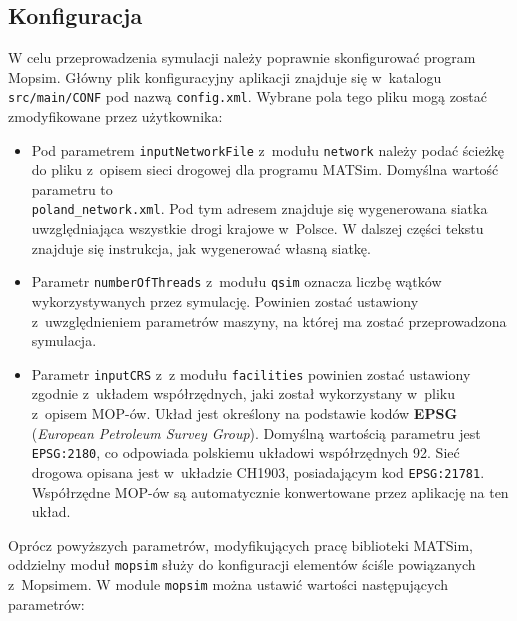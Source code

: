 \subsection{Konfiguracja}
W celu przeprowadzenia symulacji należy poprawnie skonfigurować program Mopsim. Główny plik konfiguracyjny aplikacji znajduje się w~katalogu \texttt{src/main/CONF} pod nazwą \texttt{config.xml}. Wybrane pola tego pliku mogą zostać zmodyfikowane przez użytkownika:
\begin{itemize}
\item Pod parametrem \texttt{inputNetworkFile} z~modułu \texttt{network} należy podać ścieżkę do pliku z~opisem sieci drogowej dla programu MATSim. Domyślna wartość parametru to \\\texttt{poland\_network.xml}. Pod tym adresem znajduje się wygenerowana siatka uwzględniająca wszystkie drogi krajowe w~Polsce. W dalszej części tekstu znajduje się instrukcja, jak wygenerować własną siatkę.
\item Parametr \texttt{numberOfThreads} z~modułu \texttt{qsim} oznacza liczbę wątków wykorzystywanych przez symulację. Powinien zostać ustawiony z~uwzględnieniem parametrów maszyny, na której ma zostać przeprowadzona symulacja.
\item Parametr \texttt{inputCRS} z~z modułu \texttt{facilities} powinien zostać ustawiony zgodnie z~układem współrzędnych, jaki został wykorzystany w~pliku z~opisem MOP-ów. Układ jest określony na podstawie kodów \textbf{EPSG} (\textit{European Petroleum Survey Group}). Domyślną wartością parametru jest \texttt{EPSG:2180}, co odpowiada polskiemu układowi współrzędnych 92. Sieć drogowa opisana jest w~układzie CH1903, posiadającym kod \texttt{EPSG:21781}. Współrzędne MOP-ów są automatycznie konwertowane przez aplikację na ten układ.
\end{itemize}
Oprócz powyższych parametrów, modyfikujących pracę biblioteki MATSim, oddzielny moduł \texttt{mopsim} służy do konfiguracji elementów ściśle powiązanych z~Mopsimem. W module \texttt{mopsim} można ustawić wartości następujących parametrów:

